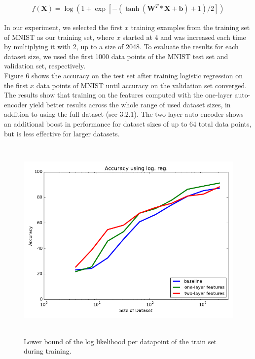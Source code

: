 \documentclass{article}
\begin{document}
\begin{align}
    f(\textbf{X}) = \log(1 + \exp[-(\tanh(\textbf{W}^T*\textbf{X} + \textbf{b}) + 1)/2])
\end{align}

In our experiment, we selected the first $x$ training examples from the training set of MNIST as our training set, where $x$ started at 4 and was increased each time by multiplying it with 2, up to a size of 2048. To evaluate the results for each dataset size, we used the first 1000 data points of the MNIST test set and validation set, respectively.\\
Figure 6 shows the accuracy on the test set after training logistic regression on the first $x$ data points of MNIST until accuracy on the validation set converged. The results show that training on the features computed with the one-layer auto-encoder yield better results across the whole range of used dataset sizes, in addition to using the full dataset (see 3.2.1). The two-layer auto-encoder shows an additional boost in performance for dataset sizes of up to 64 total data points, but is less effective for larger datasets. \\

\begin{figure}[htb]
\begin{center}
\includegraphics[height=4in,width=5in]{logreg_smallsets_report.png}
\caption{Lower bound of the log likelihood per datapoint of the train set during training.}
\end{center}
\end{figure}
\end{document}
